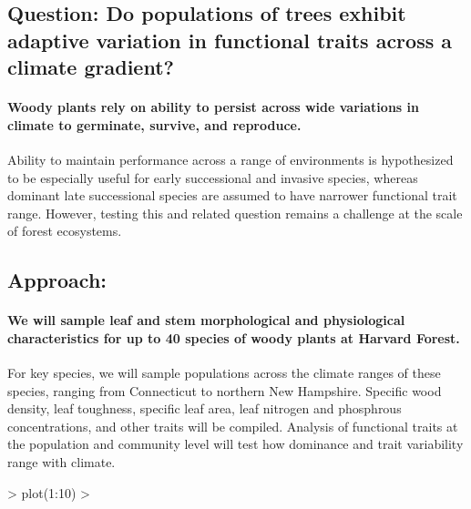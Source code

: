 \documentclass[11pt]{article}
\begin{document}
\subsection{Question: Do populations of trees exhibit adaptive variation in functional traits across a climate gradient?}

\paragraph{Woody plants rely on ability to persist across wide variations in climate to germinate, survive, and reproduce.} Ability to maintain performance across a range of environments is hypothesized to be especially useful for early successional and invasive species, whereas dominant late successional species are assumed to have narrower functional trait range. However, testing this and related question remains a challenge at the scale of forest ecosystems.

\subsection{Approach:}

\paragraph{We will sample leaf and stem morphological and physiological characteristics for up to 40 species of woody plants at Harvard Forest.} For key species, we will sample populations across the climate ranges of these species, ranging from Connecticut to northern New Hampshire. Specific wood density, leaf toughness, specific leaf area, leaf nitrogen and phosphrous concentrations, and other traits will be compiled. Analysis of functional traits at the population and community level will test how dominance and trait variability range with climate.


\begin{Schunk}
\begin{Sinput}
> plot(1:10)
> 
\end{Sinput}
\end{Schunk}


\end{document}
